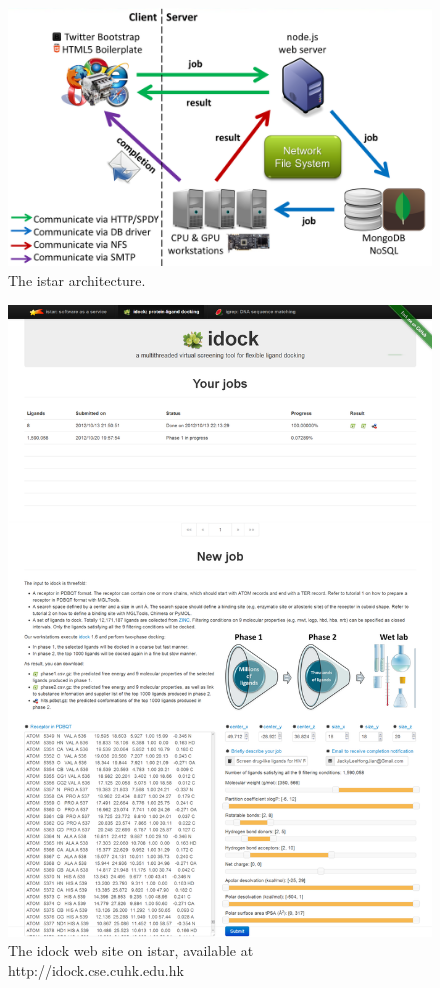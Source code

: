 \documentclass[12pt]{article}
\begin{document}
\begin{figure}
\begin{center}
\includegraphics[width=\linewidth,keepaspectratio=true]{Architecture.png}
\caption{\label{architecture} The istar architecture.}
\end{center}
\end{figure}

\clearpage

\begin{figure}
\begin{center}
\includegraphics[width=0.9\linewidth,keepaspectratio=true]{idock.png}
\caption{\label{idock} The idock web site on istar, available at http://idock.cse.cuhk.edu.hk}
\end{center}
\end{figure}
\end{document}
